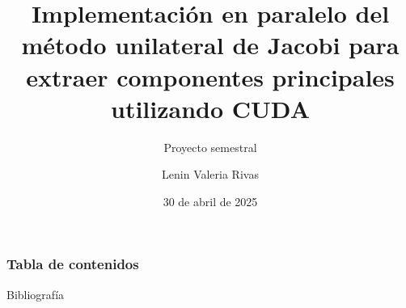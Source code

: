 \documentclass[xcolor=dvipsnames]{beamer}
\title[Proyecto semestral] %
{Implementación en paralelo del método unilateral de Jacobi para extraer componentes principales utilizando CUDA}
\subtitle{Proyecto semestral}
\author[Lenin Valeria Rivas] %
{Lenin Valeria Rivas}
\institute[UdeC] %
{
    Cecilia Hernández Rivas
    \and
    Facultad de Ingeniería\\
    Universidad de Concepción
  
}
\date[30-04-2025] %
{30 de abril de 2025}
\begin{document}
\frame{\titlepage}

\begin{frame}
    \frametitle{Tabla de contenidos}
    \tableofcontents
\end{frame}







\begin{frame}{Bibliografía}

\printbibliography[title={Bibliografía}]

\end{frame}

\frame{\titlepage}
\end{document}
